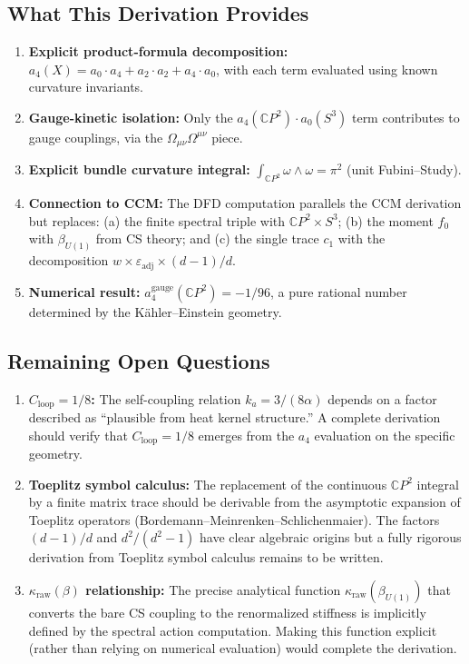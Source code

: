 \documentclass[12pt,a4paper]{article}
\begin{document}
\subsection{What This Derivation Provides}

\begin{enumerate}
\item \textbf{Explicit product-formula decomposition:}
$a_4(X) = a_0 \cdot a_4 + a_2 \cdot a_2 + a_4 \cdot a_0$, with
each term evaluated using known curvature invariants.

\item \textbf{Gauge-kinetic isolation:} Only the
$a_4(\mathbb{C}P^2) \cdot a_0(S^3)$ term contributes to gauge couplings,
via the $\Omega_{\mu\nu}\Omega^{\mu\nu}$ piece.

\item \textbf{Explicit bundle curvature integral:}
$\int_{\mathbb{C}P^2} \omega \wedge \omega = \pi^2$
(unit Fubini--Study).

\item \textbf{Connection to CCM:} The DFD computation parallels the CCM
derivation but replaces: (a) the finite spectral triple with
$\mathbb{C}P^2 \times S^3$; (b) the moment $f_0$ with $\beta_{U(1)}$
from CS theory; and (c) the single trace $c_1$ with the decomposition
$w \times \varepsilon_{\mathrm{adj}} \times (d{-}1)/d$.

\item \textbf{Numerical result:} $a_4^{\mathrm{gauge}}(\mathbb{C}P^2) = -1/96$,
a pure rational number determined by the K\"ahler--Einstein geometry.
\end{enumerate}

\subsection{Remaining Open Questions}

\begin{enumerate}
\item \textbf{$C_{\mathrm{loop}} = 1/8$:} The self-coupling relation
$k_a = 3/(8\alpha)$ depends on a factor described as ``plausible from
heat kernel structure.''  A complete derivation should verify that
$C_{\mathrm{loop}} = 1/8$ emerges from the $a_4$ evaluation on the
specific geometry.

\item \textbf{Toeplitz symbol calculus:} The replacement of the continuous
$\mathbb{C}P^2$ integral by a finite matrix trace should be derivable from
the asymptotic expansion of Toeplitz operators (Bordemann--Meinrenken--Schlichenmaier).
The factors $(d{-}1)/d$ and $d^2/(d^2{-}1)$ have clear algebraic origins
but a fully rigorous derivation from Toeplitz symbol calculus remains to be
written.

\item \textbf{$\kappa_{\mathrm{raw}}(\beta)$ relationship:} The precise
analytical function $\kappa_{\mathrm{raw}}(\beta_{U(1)})$ that converts the
bare CS coupling to the renormalized stiffness is implicitly defined by
the spectral action computation.  Making this function explicit (rather than
relying on numerical evaluation) would complete the derivation.
\end{enumerate}
\end{document}
